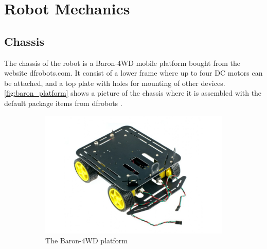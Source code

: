 \documentclass[Main]{subfiles}
\begin{document}
\section{Robot Mechanics} %
	\label{sec:robot_mechanics}

	\subsection{Chassis} %
	\label{sub:chassis}
		The chassis of the robot is a Baron-4WD mobile platform bought from the website dfrobots.com. 
		It consist of a lower frame where up to four DC motors can be attached, and a top plate with holes for mounting of other devices. 
		\autoref{fig:baron_platform} shows a picture of the chassis where it is assembled with the default package items from dfrobots \cite{DFRobot2015}.
		\begin{figure}[H]
			\centering
			\begin{subfigure}[b]{0.55\linewidth}
				\includegraphics[width=1\linewidth]{./Figures/baron_platform.jpg}
				\caption{The Baron-4WD platform}
				\label{fig:baron_platform}
			\end{subfigure}	
			\begin{subfigure}[b]{0.4\linewidth}

\end{subfigure}
\end{figure}
\end{document}
